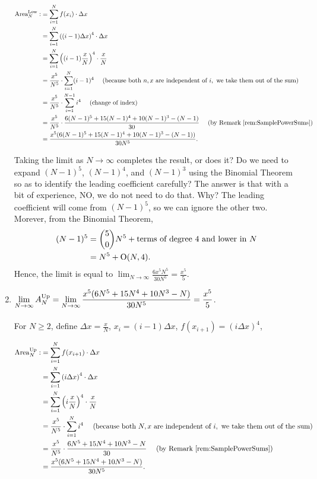 \begin{enumerate}
\begin{align*}
    {\rm Area}^{\rm Low}_N :&=   \sum_{i=1}^N f(x_i)\cdot \Delta x \\
    &=   \sum_{i=1}^N \left((i-1) \Delta x \right)^4 \cdot \Delta x  \\
    &=  \sum_{i=1}^N \left((i-1) \frac{x}{N}\right)^4 \cdot \frac{x}{N} \\
    &= \frac{x^5}{N^5} \cdot  \sum_{i=1}^N (i-1)^4 ~~~~(\text{because both } n, x \text{ are independent of } i,\text{ we take them out of the sum}) \\
     &= \frac{x^5}{N^5} \cdot  \sum_{i=1}^{N-1} i^4 ~~~~(\text{change of index}) \\
    &= \frac{x^5}{N^5} \cdot \frac{6(N-1)^5+15(N-1)^4+10(N-1)^3-(N-1)}{30} ~~~~(\text{by Remark }\ref{rem:SamplePowerSums})\\
    & = \frac{x^5(6(N-1)^5+15(N-1)^4+10(N-1)^3-(N-1)) }{30 N^5}.
\end{align*}

Taking the limit as $N \to \infty$ completes the result, or does it? Do we need to expand $(N-1)^5$, $(N-1)^4$, and $(N-1)^3$ using the Binomial Theorem so as to identify the leading coefficient carefully? The answer is that with a bit of experience, NO, we do not need to do that. Why? The leading coefficient will come from $(N-1)^5$, so we can ignore the other two. Morever, from the Binomial Theorem,
\begin{align*}
(N-1)^5 &= \binom{5}{0}N^5 + \text{terms of degree 4 and lower in } N \\
&= N^5 + \mathrm{O}(N,4). 
\end{align*}
Hence, the limit is equal to $\displaystyle\lim_{N \to \infty} \frac{6 x^5 N^5}{30 N^5} =  \frac{x^5}{5}$.

 \item \Ans $\displaystyle\lim_{N \to \infty} A^{\rm Up}_N = \displaystyle\lim_{N \to \infty} \frac{x^5(6N^5+15N^4+10N^3-N) }{30 N^5} = \frac{x^5}{5}$.\\ \\

     

For $N \ge 2$, define $\Delta x =\frac{x}{N}$, $x_i = (i-1) \Delta x$, $f(x_{i+1})= \left(i \Delta x \right)^4$,

\begin{align*}
    {\rm Area}^{\rm Up}_N :&=   \sum_{i=1}^N f(x_{i+1})\cdot \Delta x \\
    &=   \sum_{i=1}^N \left(i \Delta x \right)^4 \cdot \Delta x  \\
    &=  \sum_{i=1}^N \left(i \frac{x}{N}\right)^4 \cdot \frac{x}{N} \\
    &= \frac{x^5}{N^5} \cdot  \sum_{i=1}^N i^4 ~~~~(\text{because both } N, x \text{ are independent of } i,\text{ we take them out of the sum}) \\
    &= \frac{x^5}{N^5} \cdot \frac{6N^5+15N^4+10N^3-N}{30} ~~~~(\text{by Remark }\ref{rem:SamplePowerSums})\\
    & = \frac{x^5(6N^5+15N^4+10N^3-N) }{30 N^5}.
\end{align*}


\end{enumerate}
